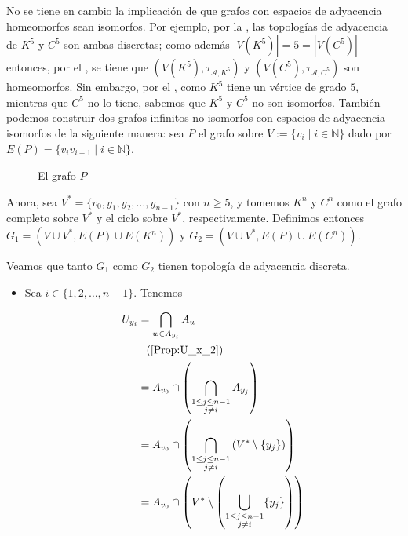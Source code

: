 \begin{Obs}
   No se tiene en cambio la implicación de que grafos con espacios de adyacencia homeomorfos sean isomorfos. Por ejemplo, por la , las topologías de adyacencia de $K^5$ y $C^5$ son ambas discretas; como además $|V\left( K^5\right)|=5=|V\left( C^5\right)|$ entonces, por el , se tiene que $\left( V\left( K^5\right),\tau_{\mathcal{A},K^5}\right)$ y $\left( V\left( C^5\right),\tau_{\mathcal{A},C^5}\right)$ son homeomorfos. Sin embargo, por el , como $K^5$ tiene un vértice de grado $5$, mientras que $C^5$ no lo tiene, sabemos que $K^5$ y $C^5$ no son isomorfos. También podemos construir dos grafos infinitos no isomorfos con espacios de adyacencia isomorfos de la siguiente manera: sea $P$ el grafo sobre $V:=\{v_i\mid i\in\mathbb{N}\}$ dado por $E(P)=\{v_iv_{i+1}\mid i\in \mathbb{N}\}$.
   \begin{figure}[H]
     \centering
       \resizebox{0.45\textwidth}{!}{} 
     \caption{El grafo $P$}
   \end{figure}
   Ahora, sea $V^*=\{v_0,y_1,y_2,\dots,y_{n-1}\}$ con $n\ge 5$, y tomemos $K^n$ y $C^n$ como el grafo completo sobre $V^*$ y el ciclo sobre $V^*$, respectivamente. Definimos entonces $G_1=\left( V\cup V^*, E(P)\cup E\left( K^n\right)\right)$ y $G_2=\left( V\cup V^*, E(P)\cup E\left( C^n\right) \right)$.
    
   
   Veamos que tanto $G_1$ como $G_2$ tienen topología de adyacencia discreta.
   \begin{itemize}
      \item[$G_1$:] Sea $i\in\{1,2,\dots,n-1\}$. Tenemos
         \begin{ceqn}
         \begin{align*}
            U_{y_i} &= \bigcap_{w\in A_{y_i}}A_w \\
                    &\phantom{=} \text{(\Cref{Prop:U_x_2})} \\
                    &= A_{v_0}\cap \left( \bigcap_{\substack{1\le j\le n-1 \\ j\ne i}}A_{y_j}\right)\\
                    &= A_{v_0}\cap \left( \bigcap_{\substack{1\le j\le n-1 \\ j\ne i}}\left(V^* \setminus \{y_j\}\right)\right)\\
                    &= A_{v_0} \cap \left( V^*\setminus \left( \bigcup_{\substack{1\le j\le n-1 \\ j\ne i}}\{y_j\}\right)\right)\\

\end{align*}
\end{ceqn}
\end{itemize}
\end{Obs}
